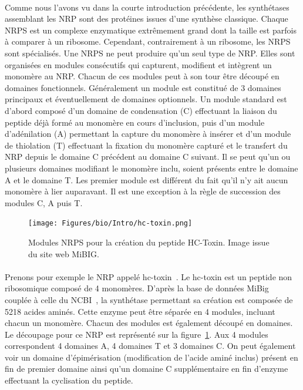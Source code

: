 \documentclass[12pt,french,twoside]{report}
\begin{document}
\paragraph{}Comme nous l'avons vu dans la courte introduction précédente, les synthétases assemblant les NRP sont des protéines issues d'une synthèse classique.
Chaque NRPS est un complexe enzymatique extrêmement grand dont la taille est parfois à comparer à un ribosome.
Cependant, contrairement à un ribosome, les NRPS sont spécialisés.
Une NRPS ne peut produire qu'un seul type de NRP.
Elles sont organisées en modules consécutifs qui capturent, modifient et intègrent un monomère au NRP\cite{schwarzer_nonribosomal_2003,marahiel_modular_1997}.
Chacun de ces modules peut à son tour être découpé en domaines fonctionnels.
Généralement un module est constitué de 3 domaines principaux et éventuellement de domaines optionnels\cite{finking_biosynthesis_2004}.
Un module standard est d'abord composé d'un domaine de condensation (C) effectuant la liaison du peptide déjà formé au monomère en cours d'inclusion, puis d'un module d'adénilation (A) permettant la capture du monomère à insérer et d'un module de thiolation (T) effectuant la fixation du monomère capturé et le transfert du NRP depuis le domaine C précédent au domaine C suivant.
Il se peut qu'un ou plusieurs domaines modifiant le monomère inclu, soient présents entre le domaine A et le domaine T.
Les premier module est différent du fait qu'il n'y ait aucun monomère à lier auparavant.
Il est une exception à la règle de succession des modules C, A puis T.

\begin{figure}[h!]
  \begin{center}
    \texttt{[image: Figures/bio/Intro/hc-toxin.png]}
    \caption{\label{mibig_hc}Modules NRPS pour la création du peptide HC-Toxin.
    Image issue du site web MiBIG.}
  \end{center}
\end{figure}

\paragraph{}Prenons pour exemple le NRP appelé hc-toxin~\cite{_mibig:_????}.
Le hc-toxin est un peptide non ribosomique composé de 4 monomères.
D'après la base de données MiBig~\cite{medema_minimum_2015} couplée à celle du NCBI~\cite{ncbi_resource_coordinators_database_2013}, la synthétase permettant sa création est composée de 5218 acides aminés.
Cette enzyme peut être séparée en 4 modules, incluant chacun un monomère.
Chacun des modules est également découpé en domaines.
Le découpage pour ce NRP est représenté sur la figure~\ref{mibig_hc}.
Aux 4 modules correspondent 4 domaines A, 4 domaines T et 3 domaines C.
On peut également voir un domaine d'épimérisation (modification de l'acide aminé inclus) présent en fin de premier domaine ainsi qu'un domaine C supplémentaire en fin d'enzyme effectuant la cyclisation du peptide.
\end{document}
